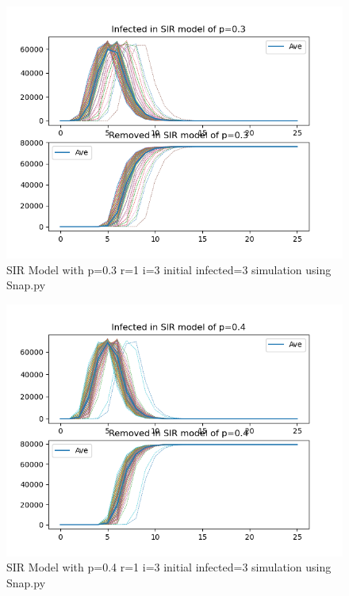 \documentclass{subfile}
\begin{document}
  \begin{figure}
  \includegraphics[scale=0.8]{sirp03r1i3s3}
  \caption[SIR p=0.3,r=1,i=3,init infected=3]{SIR Model with p=0.3 r=1 i=3 initial infected=3 simulation using Snap.py}
  \end{figure}
  \begin{figure}
  \includegraphics[scale=0.8]{sirp04r1i3s3}
  \caption[SIR p=0.4,r=1,i=3,init infected=3]{SIR Model with p=0.4 r=1 i=3 initial infected=3 simulation using Snap.py}
  \end{figure}
\end{document}
